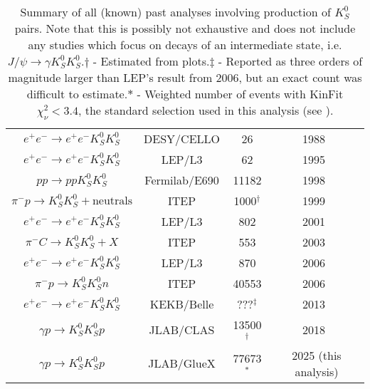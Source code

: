 \begin{table}
\begin{center}
\begin{tabular}{cccc}
$e^+e^- \to e^+e^- K_S^0 K_S^0$ & DESY/CELLO & 26 & 1988~\cite{Behrend1989}\\
$e^+e^- \to e^+e^- K_S^0 K_S^0$ & LEP/L3 & 62 & 1995~\cite{Acciarri1995}\\
$pp \to pp K_S^0 K_S^0$ & Fermilab/E690 & 11182 & 1998~\cite{Reyes1998}\\
$\pi^- p \to K_S^0 K_S^0 + \text{neutrals}$ & ITEP & 1000${}^\dagger$ & 1999~\cite{Barkov1999}\\
    $e^+e^- \to e^+e^- K_S^0 K_S^0$ & LEP/L3 & 802 & 2001~\cite{Acciarri2001}\\
  $\pi^- C \to K_S^0 K_S^0 + X$ & ITEP & 553 & 2003~\cite{Tikhomirov2003}\\
      $e^+e^- \to e^+e^- K_S^0 K_S^0$ & LEP/L3 & 870 & 2006~\cite{Schegelsky2006}\\
    $\pi^- p \to K_S^0 K_S^0 n$ & ITEP & 40553 & 2006~\cite{Vladimirsky2006}\\
    $e^+e^- \to e^+e^- K_S^0 K_S^0$ & KEKB/Belle & ???${}^\ddagger$ & 2013~\cite{Uehara2013}\\
    $\gamma p \to K_S^0 K_S^0 p$ & JLAB/CLAS & 13500${}^\dagger$ & 2018~\cite{Chandavar2018}\\
      $\gamma p \to K_S^0 K_S^0 p$ & JLAB/GlueX & 77673${}^\ast$ & 2025 (this analysis)\\\bottomrule
    \end{tabular}
    \caption{Summary of all (known) past analyses involving production of $K_S^0$ pairs. Note that this is possibly not exhaustive and does not include any studies which focus on decays of an intermediate state, i.e. $J/\psi \to \gamma K_S^0K_S^0$.\newline$\dagger$ - Estimated from plots.\newline$\ddagger$ - Reported as three orders of magnitude larger than LEP's result from 2006, but an exact count was difficult to estimate.\newline$\ast$ - Weighted number of events with KinFit $\chi^2_\nu < 3.4$, the standard selection used in this analysis (see ).}\label{tab:past-analyses}
  \end{center}
\end{table}
